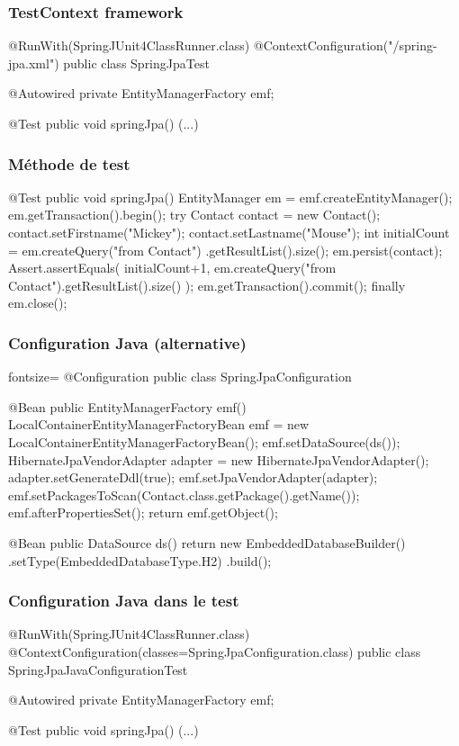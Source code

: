 \begin{frame}[fragile]
 \frametitle{TestContext framework}

 \begin{javacode}
@RunWith(SpringJUnit4ClassRunner.class)
@ContextConfiguration("/spring-jpa.xml")
public class SpringJpaTest {

  @Autowired private EntityManagerFactory emf;
  
  @Test public void springJpa() {
    (...)
  }
  
}
 \end{javacode}
\end{frame}

\begin{frame}[fragile]
 \frametitle{Méthode de test}

 \begin{javacode}
@Test public void springJpa() {
  EntityManager em = emf.createEntityManager();
  em.getTransaction().begin();
  try {
    Contact contact = new Contact();
    contact.setFirstname("Mickey");
    contact.setLastname("Mouse");
    int initialCount = em.createQuery("from Contact")
      .getResultList().size();
    em.persist(contact);
    Assert.assertEquals(
      initialCount+1,
      em.createQuery("from Contact").getResultList().size()
    );
    em.getTransaction().commit();
  } finally {
    em.close();
  }
}
 \end{javacode}
\end{frame}

\begin{frame}[fragile]
 \frametitle{Configuration Java (alternative)}

 \begin{javacode*}{fontsize=\tiny}
@Configuration
public class SpringJpaConfiguration {
  
  @Bean public EntityManagerFactory emf() {
    LocalContainerEntityManagerFactoryBean emf = 
      new LocalContainerEntityManagerFactoryBean();
    emf.setDataSource(ds());
    HibernateJpaVendorAdapter adapter = new HibernateJpaVendorAdapter();
    adapter.setGenerateDdl(true);
    emf.setJpaVendorAdapter(adapter);
    emf.setPackagesToScan(Contact.class.getPackage().getName());
    emf.afterPropertiesSet();
    return emf.getObject();
  }
  
  @Bean public DataSource ds() {
    return new EmbeddedDatabaseBuilder()
      .setType(EmbeddedDatabaseType.H2)
      .build();
  }
  
}
 \end{javacode*}
\end{frame}

\begin{frame}[fragile]
 \frametitle{Configuration Java dans le test}

 \begin{javacode}
@RunWith(SpringJUnit4ClassRunner.class)
@ContextConfiguration(classes=SpringJpaConfiguration.class)
public class SpringJpaJavaConfigurationTest {

  @Autowired private EntityManagerFactory emf;
  
  @Test public void springJpa() {
    (...)
  }
  
}
 \end{javacode}
\end{frame}
